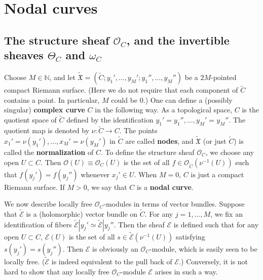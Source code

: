 \documentclass[12pt,b5paper,notitlepage]{report}
\theoremstyle{definition}
\theoremstyle{plain}
\newcommand{\fk}{\mathfrak}
\newcommand{\wtd}{\widetilde}
\newcommand{\scr}{\mathscr}
\newcommand{\Nbb}{\mathbb N}
\numberwithin{equation}{section}
\begin{document}
\section{Nodal curves}\label{lb20}

\subsection*{The structure sheaf $\scr O_C$, and the invertible sheaves $\Theta_C$ and $\omega_C$}

Choose $M\in\Nbb$, and let $\wtd{\fk X}=(\wtd C;y_1',\dots,y_M';y_1'',\dots,y_M'')$ be a $2M$-pointed compact Riemann surface. (Here we do not require that each component of $\wtd C$ contains a point. In particular, $M$ could be $0$.) One can define a (possibly singular) \textbf{complex curve} $C$ in the following way. As a topological space, $C$ is the quotient space of $\wtd C$ defined by the identification $y_1'=y_1'',\dots,y_M'=y_M''$. The quotient map is denoted by $\nu:\wtd C\rightarrow C$. The points $x_1'=\nu(y_1'),\dots,x_M'=\nu(y_M')$ in $\wtd C$ are called \textbf{nodes}, and $\wtd{\fk X}$ (or just $\wtd C$) is called the \textbf{normalization} of $C$. To define the structure sheaf $\scr O_C$, we choose any open $U\subset C$. Then $\scr O(U)\equiv\scr O_C(U)$ is the set of all  $f\in\scr O_{\wtd C}(\nu^{-1}(U))$ such that $f(y_j')=f(y_j'')$ whenever $x_j'\in U$. When $M=0$, $C$ is just a compact Riemann surface. If $M>0$, we say that $C$ is a \textbf{nodal curve}.


We now describe locally free $\scr O_C$-modules in terms of vector bundles. Suppose that $\wtd {\scr E}$ is a (holomorphic) vector bundle on $\wtd C$. For any $j=1,\dots,M$, we fix an identification of fibers $\wtd{\scr E}|y_j'\simeq \wtd{\scr E}|y_j''$. Then the sheaf $\scr E$ is defined such that for any open $U\subset C$, $\scr E(U)$ is the set of all $s\in\wtd{\scr E}(\nu^{-1}(U))$ satisfying $s(y_j')=s(y_j'')$. Then $\scr E$ is obviously an $\scr O_C$-module, which is easily seen to be locally free.  ($\wtd{\scr E}$ is indeed equivalent to the pull back of $\scr E$.) Conversely, it is not hard to show that any locally free $\scr O_C$-module $\scr E$ arises in such a way. 
\end{document}
